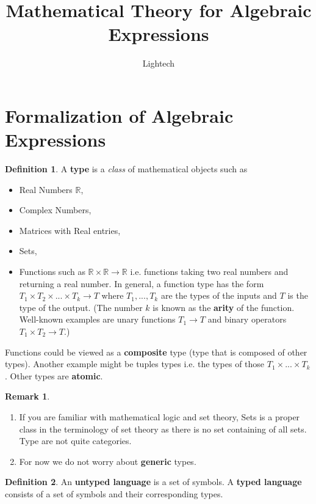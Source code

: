 \documentclass{amsart}
\title{Mathematical Theory for Algebraic Expressions}
\author{Lightech}
\theoremstyle{definition}
\newtheorem{defn}{Definition}
\newtheorem*{remark}{Remark}
\newcommand{\term}[1]{\textbf{#1}}
\newcommand{\R}{\mathbb{R}}
\begin{document}
\maketitle

\section{Formalization of Algebraic Expressions}

\begin{defn}
A \term{type} is a \emph{class} of mathematical objects such as
\begin{itemize}
\item Real Numbers $\R$,
\item Complex Numbers,
\item Matrices with Real entries,
\item Sets,
\item Functions such as $\R \times \R \rightarrow \R$ i.e. functions taking two real numbers and returning a real number. In general, a function type has the form $T_1 \times T_2 \times ... \times T_k \rightarrow T$ where $T_1, ..., T_k$ are the types of the inputs and $T$ is the type of the output. (The number $k$ is known as the \term{arity} of the function. Well-known examples are unary functions $T_1 \rightarrow T$ and binary operators $T_1 \times T_2 \rightarrow T$.)
\end{itemize}

Functions could be viewed as a \term{composite} type (type that is composed of other types). Another example might be tuples types i.e. the types of those $T_1 \times ... \times T_k$. Other types are \term{atomic}.
\end{defn}

\begin{remark}
\begin{enumerate}
\item If you are familiar with mathematical logic and set theory, Sets is a proper class in the terminology of set theory as there is no set containing of all sets. Type are not quite categories.
\item For now we do not worry about \term{generic} types.
\end{enumerate}
\end{remark}

\begin{defn}
An \term{untyped language} is a set of symbols. A \term{typed language} consists of a set of symbols and their corresponding types.
\end{defn}
\end{document}

